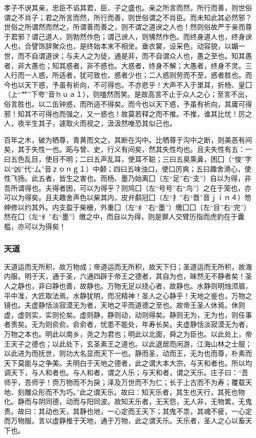 \documentclass[]{article}
\begin{document}
孝子不谀其亲，忠臣不谄其君，臣、子之盛也。亲之所言而然，所行而善，则世俗谓之不肖子；君之所言而然，所行而善，则世俗谓之不肖臣。而未知此其必然邪？世俗之所谓然而然之，所谓善而善之，则不谓之道谀之人也！然则俗故严于亲而尊于君邪？谓己道人，则勃然作色；谓己谀人，则怫然作色。而终身道人也，终身谀人也，合譬饰辞聚众也，是终始本末不相坐。垂衣裳，设采色，动容貌，以媚一世，而不自谓道谀；与夫人之为徒，通是非，而不自谓众人也，愚之至也。知其愚者，非大愚也；知其惑者，非不惑也。大惑者，终身不解；大愚者，终身不灵。三人行而一人惑，所适者，犹可致也，惑者少也；二人惑则劳而不至，惑者胜也。而今也以天下惑，予虽有祈向，不可得也。不亦悲乎！大声不入于里耳，折杨、皇囗（上``艹''下夸''音ｈｕａ１），则嗑然而笑。是故高言不止于众人之心；至言不出，俗言胜也。以二缶钟惑，而所适不得矣。而今也以天下惑，予虽有祈向，其庸可得邪！知其不可得也而强之，又一惑也！故莫若释之而不推。不推，谁其比忧！厉之人，夜半生其子，遽取火而视之，汲汲然唯恐其似己也。

百年之木，破为牺尊，青黄而文之，其断在沟中。比牺尊于沟中之断，则美恶有间矣，其于失性一也。跖与曾、史，行义有间矣，然其失性均也。且夫失性有五：一曰五色乱目，使目不明；二曰五声乱耳，使耳不聪；三曰五臭熏鼻，困囗（``悛''字以``凶''代``厶''音ｚｏｎｇ１）中颡；四曰五味浊口，使口厉爽；五曰趣舍滑心，使性飞扬。此五者，皆生之害也。而杨、墨乃始离囗（左``足''右``支''）自以为得，非吾所谓得也。夫得者困，可以为得乎？则鸠囗（左``号号''右``鸟''）之在于笼也，亦可以为得矣。且夫趣舍声色以柴其内，皮弁鹬冠囗（左``扌''右``晋''音ｊｉｎ４）笏绅修以约其外。内支盈于柴栅，外重囗（左``纟''右``墨''）缴囗囗（左``目''右``完''）然在囗（左``纟''右``墨''）缴之中，而自以为得，则是罪人交臂历指而虎豹在于囊槛，亦可以为得矣！

\hypertarget{header-n249}{%
\subsubsection{天道}\label{header-n249}}

天道运而无所积，故万物成；帝道运而无所积，故天下归；圣道运而无所积，故海内服。明于天，通于圣，六通四辟于帝王之德者，其自为也，昧然无不静者矣！圣人之静也，非曰静也善，故静也。万物无足以挠心者，故静也。水静则明烛须眉，平中准，大匠取法焉。水静犹明，而况精神！圣人之心静乎！天地之鉴也，万物之镜也。夫虚静恬淡寂漠无为者，天地之平而道德之至也。故帝王圣人休焉。休则虚，虚则实，实则伦矣。虚则静，静则动，动则得矣。静则无为，无为也，则任事者责矣。无为则俞俞。俞俞者，忧患不能处，年寿长矣。夫虚静恬淡寂漠无为者，万物之本也。明此以南乡，尧之为君也；明此以北面，舜之为臣也。以此处上，帝王天子之德也；以此处下，玄圣素王之道也。以此退居而闲游，江海山林之士服；以此进为而抚世，则功大名显而天下一也。静而圣，动而王，无为也而尊，朴素而天下莫能与之争美。夫明白于天地之德者，此之谓大本大宗，与天和者也。所以均调天下，与人和者也。与人和者，谓之人乐；与天和者，谓之天乐。庄子曰：``吾师乎，吾师乎！赍万物而不为戾；泽及万世而不为仁；长于上古而不为寿；覆载天地、刻雕众形而不为巧。''此之谓天乐。故曰：知天乐者，其生也天行，其死也物化。静而与阴同德，动而与阳同波。故知天乐者，无天怨，无人非，无物累，无鬼责。故曰：其动也天，其静也地，一心定而王天下；其鬼不祟，其魂不疲，一心定而万物服。言以虚静推于天地，通于万物，此之谓天乐。天乐者，圣人之心以畜天下也。
\end{document}
